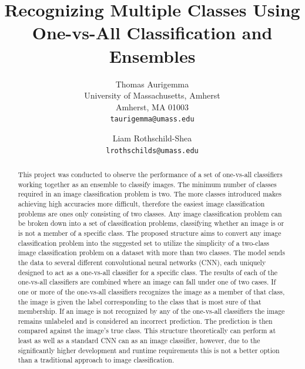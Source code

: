 \documentclass[10pt,twocolumn,letterpaper]{article}
\begin{document}
\title{Recognizing Multiple Classes Using One-vs-All Classification and Ensembles}

\author{Thomas Aurigemma\\
University of Massachusetts, Amherst\\
Amherst, MA 01003\\
{\tt\small taurigemma@umass.edu}
\and
Liam Rothschild-Shea\\
{\tt\small lrothschilds@umass.edu}
}

\maketitle

\begin{abstract}
   This project was conducted to observe the performance of a set of one-vs-all classifiers working together as an ensemble to classify images. The minimum number of classes required in an image classification problem is two. The more classes introduced makes achieving high accuracies more difficult, therefore the easiest image classification problems are ones only consisting of two classes. Any image classification problem can be broken down into a set of classification problems, classifying whether an image is or is not a member of a specific class. The proposed structure aims to convert any image classification problem into the suggested set to utilize the simplicity of a two-class image classification problem on a dataset with more than two classes. The model sends the data to several different convolutional neural networks (CNN), each uniquely designed to act as a one-vs-all classifier for a specific class. The results of each of the one-vs-all classifiers are combined where an image can fall under one of two cases. If one or more of the one-vs-all classifiers recognizes the image as a member of that class, the image is given the label corresponding to the class that is most sure of that membership. If an image is not recognized by any of the one-vs-all classifiers the image remains unlabeled and is considered an incorrect prediction. The prediction is then compared against the image’s true class. This structure theoretically can perform at least as well as a standard CNN can as an  image classifier, however, due to the significantly higher development and runtime requirements this is not a better option than a traditional approach to image classification.
\end{abstract}
\end{document}
